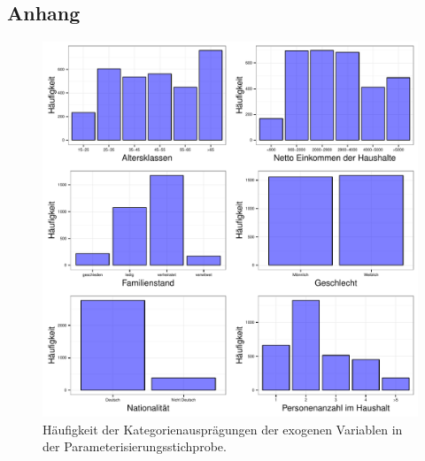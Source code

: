 \documentclass{Vorlage}
\begin{document}
\begin{appendix}

\section*{Anhang}

\begin{figure}[h]
 \begin{center}
 \includegraphics[scale=0.8]{Pictures/BarData}
 \caption{Häufigkeit der Kategorienausprägungen der exogenen Variablen in der Parameterisierungsstichprobe.}
 \label{exogen_parametrisierungsdatensatz}
 \end{center}
\end{figure}



\end{appendix}
\end{document}
